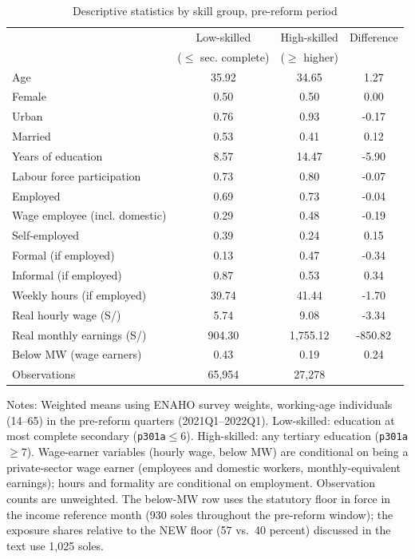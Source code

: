 \begin{table}[H]\centering
\caption{Descriptive statistics by skill group, pre-reform period}\label{tab:desc}
\begin{threeparttable}
\begin{tabular}{lccc}
\toprule
 & Low-skilled & High-skilled & Difference \\
 & ($\le$ sec. complete) & ($\ge$ higher) & \\
\midrule
Age & 35.92 & 34.65 & 1.27 \\
Female & 0.50 & 0.50 & 0.00 \\
Urban & 0.76 & 0.93 & -0.17 \\
Married & 0.53 & 0.41 & 0.12 \\
Years of education & 8.57 & 14.47 & -5.90 \\
Labour force participation & 0.73 & 0.80 & -0.07 \\
Employed & 0.69 & 0.73 & -0.04 \\
Wage employee (incl. domestic) & 0.29 & 0.48 & -0.19 \\
Self-employed & 0.39 & 0.24 & 0.15 \\
Formal (if employed) & 0.13 & 0.47 & -0.34 \\
Informal (if employed) & 0.87 & 0.53 & 0.34 \\
Weekly hours (if employed) & 39.74 & 41.44 & -1.70 \\
Real hourly wage (S/) & 5.74 & 9.08 & -3.34 \\
Real monthly earnings (S/) & 904.30 & 1,755.12 & -850.82 \\
Below MW (wage earners) & 0.43 & 0.19 & 0.24 \\
\midrule
Observations & 65,954 & 27,278 & \\
\bottomrule
\end{tabular}
\begin{tablenotes}\footnotesize
\item Notes: Weighted means using ENAHO survey weights, working-age individuals (14--65) in the pre-reform quarters (2021Q1--2022Q1). Low-skilled: education at most complete secondary (\texttt{p301a}$\le$6). High-skilled: any tertiary education (\texttt{p301a}$\ge$7). Wage-earner variables (hourly wage, below MW) are conditional on being a private-sector wage earner (employees and domestic workers, monthly-equivalent earnings); hours and formality are conditional on employment. Observation counts are unweighted. The below-MW row uses the statutory floor in force in the income reference month (930 soles throughout the pre-reform window); the exposure shares relative to the NEW floor (57 vs.\ 40 percent) discussed in the text use 1{,}025 soles.
\end{tablenotes}
\end{threeparttable}\end{table}
